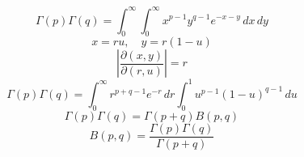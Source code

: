 \documentclass{article}
\begin{document}
\[
\Gamma(p)\Gamma(q)=\int_0^{\infty}\int_0^{\infty}x^{p-1}y^{q-1}e^{-x-y}\,dx\,dy
\]
\[
x=ru,\quad y=r(1-u)
\]
\[
\left|\frac{\partial(x,y)}{\partial(r,u)}\right|=r
\]
\[
\Gamma(p)\Gamma(q)=\int_0^{\infty}r^{p+q-1}e^{-r}\,dr\int_0^1u^{p-1}(1-u)^{q-1}\,du
\]
\[
\Gamma(p)\Gamma(q)=\Gamma(p+q)B(p,q)
\]
\[
B(p,q)=\frac{\Gamma(p)\Gamma(q)}{\Gamma(p+q)}
\]
\end{document}
